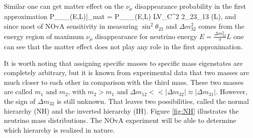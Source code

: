 Similar one can get matter effect on the $\nu_\mu$ disappearance probability in the first approximation
\be
P_{\nu_\mu \rightarrow \nu_\mu}(E,L)\Big|_{mat} = P_{\nu_\mu \rightarrow \nu_\mu}(E,L) \pm LV_C\sin^2 2\theta_{23}\theta_{13} \sin\Big(L\Big),
\ee
and since most of NOvA sensitivity in measuring $\sin^2\theta_{23}$ and $\Delta m_{32}^2$ comes from the 
energy region of maximum $\nu_\mu$ disappearance for neutrino energy $E = \frac{\Delta m_{32}^2}{\pi}L$ 
one can see that the matter effect does not play any role in the first approximation.

It is worth noting that assigning specific masses to specific mass eigenstates are completely 
arbitrary, but it is known from experimental data that two masses are much closer to each other 
in comparison with the third mass. These two masses are called $m_1$ and $m_2$, with $m_2 > m_1$ 
and $\Delta m_{12} << |\Delta m_{32}| \approx |\Delta m_{31}|$. However, the sign of $\Delta m_{32}$ 
is still unknown. That leaves two possibilities, called the normal hierarchy (NH) and the inverted 
hierarchy (IH). Figure \ref{fig:NH} illustrates the neutrino mass distributions. The NOvA experiment 
will be able to determine which hierarchy is realized in nature.

